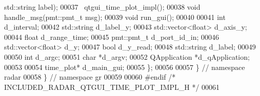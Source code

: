 \begin{DoxyCode}
       std::string label);
00037       ~qtgui_time_plot_impl();
00038       \textcolor{keywordtype}{void} handle_msg(pmt::pmt\_t msg);
00039       \textcolor{keywordtype}{void} run_gui();
00040       
00041       \textcolor{keywordtype}{int} d_interval;
00042       std::string d_label_y;
00043       std::vector<float> d_axis_y;
00044       \textcolor{keywordtype}{float} d_range_time;
00045       pmt::pmt\_t d_port_id_in;
00046       std::vector<float> d_y;
00047       \textcolor{keywordtype}{bool} d_y_read;
00048       std::string d_label;
00049       
00050       \textcolor{keywordtype}{int} d_argc;
00051       \textcolor{keywordtype}{char} *d_argv;
00052       QApplication *d_qApplication;
00053       
00054       time_plot* d_main_gui;
00055     \};
00056 
00057   \} \textcolor{comment}{// namespace radar}
00058 \} \textcolor{comment}{// namespace gr}
00059 
00060 \textcolor{preprocessor}{#endif }\textcolor{comment}{/* INCLUDED\_RADAR\_QTGUI\_TIME\_PLOT\_IMPL\_H */}\textcolor{preprocessor}{}
00061 
\end{DoxyCode}

